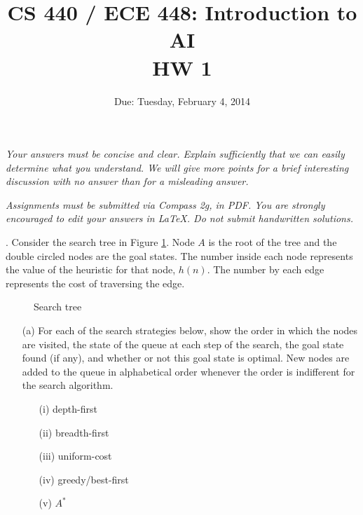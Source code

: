 \documentclass{article}
\title{CS 440 / ECE 448: Introduction to AI \\ HW 1}
\date{\vspace{-0.4in}Due: Tuesday,  February 4, 2014}
\newcounter{probcnt}
\newenvironment{problem}{\stepcounter{probcnt}{\bf Problem \arabic{probcnt}}.}{}
\begin{document}
\maketitle

\emph{Your answers must be concise and clear. Explain sufficiently that we can easily determine what you understand. We will give more points for a brief interesting discussion with no answer than for a misleading answer.}

\emph{Assignments must be submitted via Compass 2g, in PDF. You are strongly encouraged to edit your answers in LaTeX. Do not submit handwritten solutions.}

\begin{problem}{}
Consider the search tree in Figure \ref{st}. Node $A$ is the root of the tree and the double circled nodes are the goal states. The number inside each node represents the value of the heuristic for that node, $h(n)$. The number by each edge represents the cost of traversing the edge.

\begin{figure}
\caption{Search tree}
\label{st}
\end{figure}

\begin{enumerate}
\item[(a)] For each of the search strategies below, show the order in which the nodes are visited, the state of the queue at each step of the search, the goal state found (if any), and whether or not this goal state is optimal. New nodes are added to the queue in alphabetical order whenever the order is indifferent for the search algorithm.
	\begin{enumerate}
	\item[(i)] depth-first 
	\item[(ii)] breadth-first 
	\item[(iii)] uniform-cost 
	\item[(iv)] greedy/best-first
	\item[(v)] $A^*$
	\end{enumerate}


\end{enumerate}
\end{problem}
\end{document}
